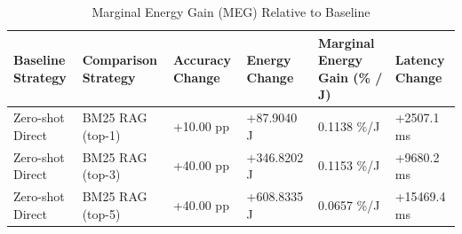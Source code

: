 \begin{table}
\caption{Marginal Energy Gain (MEG) Relative to Baseline}
\label{tab:marginal_energy_gain}
\begin{tabular}{llllll}
\toprule
Baseline Strategy & Comparison Strategy & Accuracy Change & Energy Change & Marginal Energy Gain (\% / J) & Latency Change \\
\midrule
Zero-shot Direct & BM25 RAG (top-1) & +10.00 pp & +87.9040 J & 0.1138 \%/J & +2507.1 ms \\
Zero-shot Direct & BM25 RAG (top-3) & +40.00 pp & +346.8202 J & 0.1153 \%/J & +9680.2 ms \\
Zero-shot Direct & BM25 RAG (top-5) & +40.00 pp & +608.8335 J & 0.0657 \%/J & +15469.4 ms \\
\bottomrule
\end{tabular}
\end{table}
